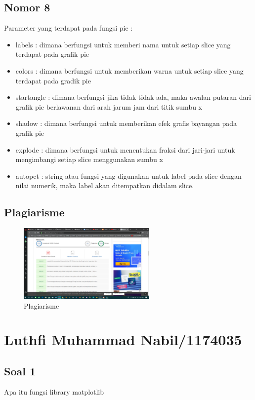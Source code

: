 	\subsection{Nomor 8}
	Parameter yang terdapat pada fungsi pie :
		\begin{itemize}
			\item labels : dimana berfungsi untuk memberi nama untuk setiap slice yang terdapat pada grafik pie
			\item colors : dimana berfungsi untuk memberikan warna untuk setiap slice yang terdapat pada gradik pie
			\item startangle : dimana berfungsi jika tidak tidak ada, maka awalan putaran dari grafik pie berlawanan dari arah jarum jam dari titik sumbu x
			\item shadow : dimana berfungsi untuk memberikan efek grafis bayangan pada grafik pie
			\item explode : dimana berfungsi untuk menentukan fraksi dari jari-jari untuk mengimbangi setiap slice menggunakan sumbu x
			\item autopct : string atau fungsi yang digunakan untuk label pada slice dengan nilai numerik, maka label akan ditempatkan didalam slice.			
		\end{itemize}
	
	\subsection{Plagiarisme}
		\begin{figure} [ht]
			\centerline{\includegraphics[width=0.6\textwidth]{figures/6/1174043/Teori/Plagiarisme6.png}}
			\caption{Plagiarisme}
			\label{Plagiarisme6}
		\end{figure}

\section{Luthfi Muhammad Nabil/1174035}
\subsection{Soal 1}
Apa itu fungsi library matplotlib

